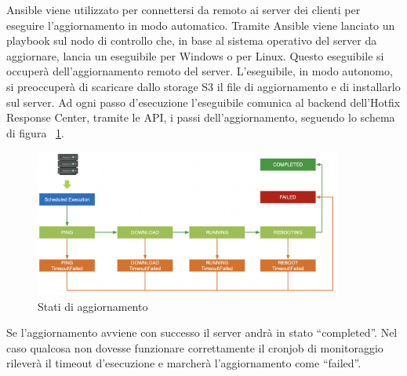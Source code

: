 Ansible viene utilizzato per connettersi da remoto ai server dei clienti per 
eseguire l’aggiornamento in modo automatico. Tramite Ansible viene lanciato un 
playbook sul nodo di controllo che, in base al sistema operativo del server da 
aggiornare, lancia un eseguibile per Windows o per Linux.
Questo eseguibile si occuperà dell'aggiornamento remoto del server. 
L’eseguibile, in modo autonomo, si preoccuperà di scaricare dallo storage 
S3 il file di aggiornamento e di installarlo sul server. 
Ad ogni passo d’esecuzione l’eseguibile comunica al backend dell’Hotfix Response Center, 
tramite le API, i passi dell’aggiornamento, seguendo lo schema di figura ~\ref{fig:Stati di aggiornamento}.

 \begin{figure}[H]
  \begin{flushright}
    \centering
    \includegraphics[width=0.90\textwidth]{imgs/update_statues.png}
    \caption{Stati di aggiornamento}
    \label{fig:Stati di aggiornamento}
  \end{flushright}
\end{figure}

Se l’aggiornamento avviene con successo il server andrà in stato “completed”.
Nel caso qualcosa non dovesse funzionare correttamente il cronjob di monitoraggio 
rileverà il timeout d’esecuzione e marcherà l’aggiornamento come “failed”.
